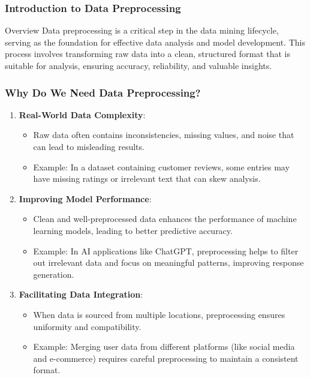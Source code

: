\documentclass[aspectratio=169]{beamer}
\begin{document}
\frame{\titlepage}

\begin{frame}[fragile]
    \frametitle{Introduction to Data Preprocessing}
    \begin{block}{Overview}
        Data preprocessing is a critical step in the data mining lifecycle, serving as the foundation for effective data analysis and model development. This process involves transforming raw data into a clean, structured format that is suitable for analysis, ensuring accuracy, reliability, and valuable insights.
    \end{block}
\end{frame}

\begin{frame}[fragile]
    \frametitle{Why Do We Need Data Preprocessing?}
    \begin{enumerate}
        \item \textbf{Real-World Data Complexity}:
            \begin{itemize}
                \item Raw data often contains inconsistencies, missing values, and noise that can lead to misleading results.
                \item Example: In a dataset containing customer reviews, some entries may have missing ratings or irrelevant text that can skew analysis.
            \end{itemize}
        
        \item \textbf{Improving Model Performance}:
            \begin{itemize}
                \item Clean and well-preprocessed data enhances the performance of machine learning models, leading to better predictive accuracy.
                \item Example: In AI applications like ChatGPT, preprocessing helps to filter out irrelevant data and focus on meaningful patterns, improving response generation.
            \end{itemize}
        
        \item \textbf{Facilitating Data Integration}:
            \begin{itemize}
                \item When data is sourced from multiple locations, preprocessing ensures uniformity and compatibility.
                \item Example: Merging user data from different platforms (like social media and e-commerce) requires careful preprocessing to maintain a consistent format.
            \end{itemize}
    \end{enumerate}
\end{frame}
\end{document}
